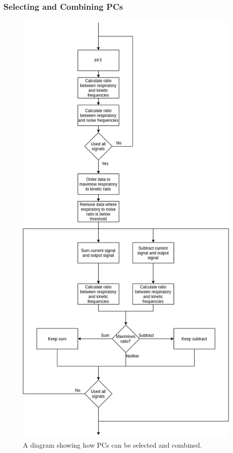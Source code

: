                 \subsubsection{Selecting and Combining PCs} \label{sec:pca_data_driven_surrogate_signal_extraction_methods_for_dynamic_pet_methods_selecting_and_combining_pcs}
                    \begin{figure}
                        \centering
                        
                        \includegraphics[width=0.7\linewidth]{figures/data_driven_surrogate_signal_extraction_methods_1_select_and_combine.png}
                        
                        \captionsetup{singlelinecheck=false}
                        \caption{
                            A diagram showing how \glspl{PC} can be selected and combined.
                        }
                        \label{fig:pca_data_driven_surrogate_signal_extraction_methods_for_dynamic_pet_methods_select_and_combine}
                    \end{figure}
                
